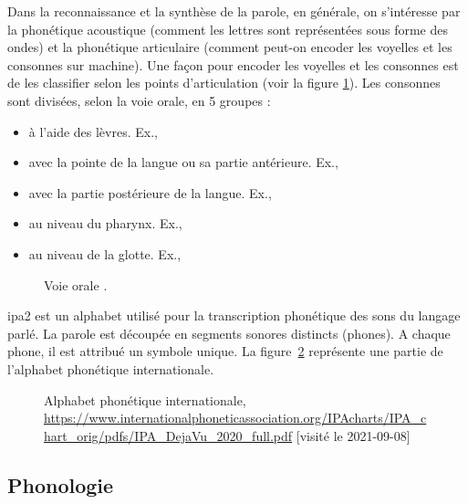 \documentclass{KodeBook}
\begin{document}
Dans la reconnaissance et la synthèse de la parole, en générale, on s'intéresse par la phonétique acoustique (comment les lettres sont représentées sous forme des ondes) et la phonétique articulaire (comment peut-on encoder les voyelles et les consonnes sur machine).
Une façon pour encoder les voyelles et les consonnes est de les classifier selon les points d'articulation (voir la figure \ref{fig:articulation}). 
Les consonnes sont divisées, selon la voie orale, en 5 groupes :
\begin{itemize}
	\item {} à l'aide des lèvres. Ex., \expword{\textipa{[b], [p], [m], [f], [v]}}
	\item {} avec la pointe de la langue ou sa partie antérieure. 
	Ex., 
	\item {} avec la partie postérieure de la langue. Ex., 
	\item {} au niveau du pharynx. 
	Ex., 
	\item {} au niveau de la glotte. 
	Ex., 
\end{itemize}

\begin{figure}[!ht]
	\centering 
	\caption[Voie orale]{Voie orale \cite{2009-ball}. \label{fig:articulation}}
\end{figure}

\ac{ipa2} est un alphabet utilisé pour la transcription phonétique des sons du langage parlé.  
La parole est découpée en segments sonores distincts (phones). 
A chaque phone, il est attribué un symbole unique. 
La figure~\ref{fig:ipa} représente une partie de l'alphabet phonétique internationale.

\begin{figure}[!ht]
	\centering 
	\caption[Alphabet phonétique internationale : IPA]{Alphabet phonétique internationale, \url{https://www.internationalphoneticassociation.org/IPAcharts/IPA_chart_orig/pdfs/IPA_DejaVu_2020_full.pdf} [visité le 2021-09-08]}
	\label{fig:ipa}
\end{figure}


\subsection{Phonologie}
\end{document}
